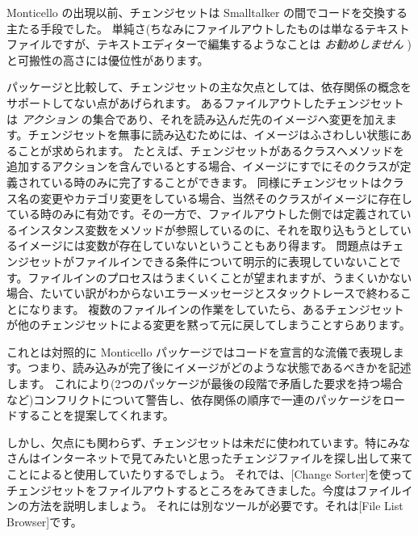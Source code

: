 \documentclass[a4paper,10pt,twoside]{book}
\begin{document}
Monticello の出現以前、チェンジセットは Smalltalker の間でコードを交換する主たる手段でした。
単純さ(ちなみにファイルアウトしたものは単なるテキストファイルですが、テキストエディターで編集するようなことは \emph{お勧めしません} )と可搬性の高さには優位性があります。

 パッケージと比較して、チェンジセットの主な欠点としては、依存関係の概念をサポートしてない点があげられます。
あるファイルアウトしたチェンジセットは \emph{アクション} の集合であり、それを読み込んだ先のイメージへ変更を加えます。チェンジセットを無事に読み込むためには、イメージはふさわしい状態にあることが求められます。
たとえば、チェンジセットがあるクラスへメソッドを追加するアクションを含んでいるとする場合、イメージにすでにそのクラスが定義されている時のみに完了することができます。
同様にチェンジセットはクラス名の変更やカテゴリ変更をしている場合、当然そのクラスがイメージに存在している時のみに有効です。その一方で、ファイルアウトした側では定義されているインスタンス変数をメソッドが参照しているのに、それを取り込もうとしているイメージには変数が存在していないということもあり得ます。
問題点はチェンジセットがファイルインできる条件について明示的に表現していないことです。ファイルインのプロセスはうまくいくことが望まれますが、うまくいかない場合、たいてい訳がわからないエラーメッセージとスタックトレースで終わることになります。
複数のファイルインの作業をしていたら、あるチェンジセットが他のチェンジセットによる変更を黙って元に戻してしまうことすらあります。

これとは対照的に Monticello パッケージではコードを宣言的な流儀で表現します。つまり、読み込みが完了後にイメージがどのような状態であるべきかを記述します。
これにより(2つのパッケージが最後の段階で矛盾した要求を持つ場合など)コンフリクトについて警告し、依存関係の順序で一連のパッケージをロードすることを提案してくれます。

しかし、欠点にも関わらず、チェンジセットは未だに使われています。特にみなさんはインターネットで見てみたいと思ったチェンジファイルを探し出して来てことによると使用していたりするでしょう。
それでは、[Change Sorter]を使ってチェンジセットをファイルアウトするところをみてきました。今度はファイルインの方法を説明しましょう。
それには別なツールが必要です。それは[File List Browser]です。
\end{document}
